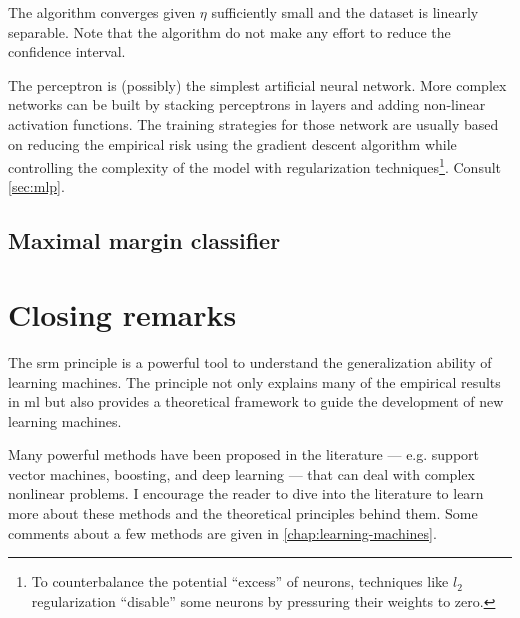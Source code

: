 The algorithm converges given $\eta$ sufficiently small and the dataset is linearly
separable.  Note that the algorithm do not make any effort to reduce the confidence
interval.

The perceptron is (possibly) the simplest artificial neural network.  More complex
networks can be built by stacking perceptrons in layers and adding non-linear activation
functions.  The training strategies for those network are usually based on reducing the
empirical risk using the gradient descent algorithm while controlling the complexity of
the model with regularization techniques\footnote{To counterbalance the potential
``excess'' of neurons, techniques like $l_2$ regularization ``disable'' some neurons by
pressuring their weights to zero.}.  Consult \cref{sec:mlp}.

\subsection{Maximal margin classifier}

\section{Closing remarks}

The \gls{srm} principle is a powerful tool to understand the generalization ability of
learning machines.  The principle not only explains many of the empirical results in
\gls{ml} but also provides a theoretical framework to guide the development of new
learning machines.

Many powerful methods have been proposed in the literature --- e.g. support vector
machines, boosting, and deep learning --- that can deal with complex nonlinear problems.
I encourage the reader to dive into the literature to learn more about these methods and
the theoretical principles behind them.  Some comments about a few methods are given in
\cref{chap:learning-machines}.

